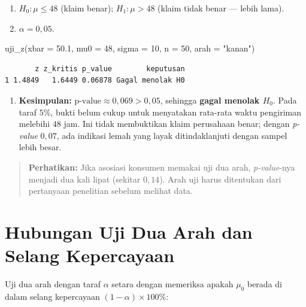 \documentclass[
  indonesian,
  letterpaper,
]{book}
\newenvironment{Shaded}{\begin{snugshade}}{\end{snugshade}}
\newcommand{\AttributeTok}[1]{\textcolor[rgb]{0.40,0.45,0.13}{#1}}
\newcommand{\DecValTok}[1]{\textcolor[rgb]{0.68,0.00,0.00}{#1}}
\newcommand{\FloatTok}[1]{\textcolor[rgb]{0.68,0.00,0.00}{#1}}
\newcommand{\FunctionTok}[1]{\textcolor[rgb]{0.28,0.35,0.67}{#1}}
\newcommand{\NormalTok}[1]{\textcolor[rgb]{0.00,0.23,0.31}{#1}}
\newcommand{\StringTok}[1]{\textcolor[rgb]{0.13,0.47,0.30}{#1}}
\providecommand{\tightlist}{%
  \setlength{\itemsep}{0pt}\setlength{\parskip}{0pt}}
\begin{document}
\begin{enumerate}
\def\labelenumi{\arabic{enumi}.}
\tightlist
\item
  \(H_0: \mu \le 48\) (klaim benar); \(H_1: \mu > 48\) (klaim tidak
  benar --- lebih lama).
\item
  \(\alpha = 0{,}05\).
\end{enumerate}

\begin{Shaded}
\begin{Highlighting}[]
\FunctionTok{uji\_z}\NormalTok{(}\AttributeTok{xbar =} \FloatTok{50.1}\NormalTok{, }\AttributeTok{mu0 =} \DecValTok{48}\NormalTok{, }\AttributeTok{sigma =} \DecValTok{10}\NormalTok{, }\AttributeTok{n =} \DecValTok{50}\NormalTok{, }\AttributeTok{arah =} \StringTok{"kanan"}\NormalTok{)}
\end{Highlighting}
\end{Shaded}

\begin{verbatim}
       z z_kritis p_value        keputusan
1 1.4849   1.6449 0.06878 Gagal menolak H0
\end{verbatim}

\begin{enumerate}
\def\labelenumi{\arabic{enumi}.}
\setcounter{enumi}{2}
\tightlist
\item
  \textbf{Kesimpulan:} \(\text{p-value} \approx 0{,}069 > 0{,}05\),
  sehingga \textbf{gagal menolak \(H_0\)}. Pada taraf \(5\%\), bukti
  belum cukup untuk menyatakan rata-rata waktu pengiriman melebihi
  \(48\) jam. Ini tidak membuktikan klaim perusahaan benar; dengan
  \emph{p-value} \(0{,}07\), ada indikasi lemah yang layak
  ditindaklanjuti dengan sampel lebih besar.
\end{enumerate}

\begin{quote}
\textbf{Perhatikan:} Jika asosiasi konsumen memakai uji dua arah,
\emph{p-value}-nya menjadi dua kali lipat (sekitar \(0{,}14\)). Arah uji
harus ditentukan dari pertanyaan penelitian sebelum melihat data.
\end{quote}

\section{Hubungan Uji Dua Arah dan Selang
Kepercayaan}\label{hubungan-uji-dua-arah-dan-selang-kepercayaan}

Uji dua arah dengan taraf \(\alpha\) setara dengan memeriksa apakah
\(\mu_0\) berada di dalam selang kepercayaan
\((1 - \alpha) \times 100\%\):
\end{document}
